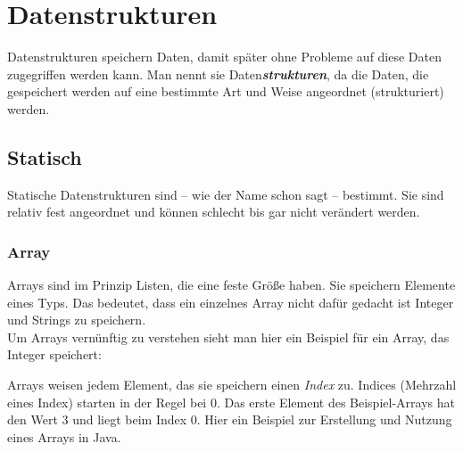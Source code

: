 \chapter{Datenstrukturen}
\begin{flushleft}   
    Datenstrukturen speichern Daten, damit später ohne Probleme auf diese Daten zugegriffen werden kann.
    Man nennt sie Daten\textbf{\textit{strukturen}}, da die Daten, die gespeichert werden auf eine bestimmte Art und Weise angeordnet (strukturiert) werden.
\end{flushleft}

\section{Statisch}
\begin{flushleft}
    Statische Datenstrukturen sind -- wie der Name schon sagt -- bestimmt.
    Sie sind relativ fest angeordnet und können schlecht bis gar nicht verändert werden.
\end{flushleft}

\subsection{Array}
\begin{flushleft}
    Arrays sind im Prinzip Listen, die eine feste Größe haben.
    Sie speichern Elemente eines Typs.
    Das bedeutet, dass ein einzelnes Array nicht dafür gedacht ist Integer und Strings zu speichern. \\
    Um Arrays vernünftig zu verstehen sieht man hier ein Beispiel für ein Array, das Integer speichert:
\end{flushleft}

\begin{center}
\end{center}

\begin{flushleft}
    Arrays weisen jedem Element, das sie speichern einen \textit{Index} zu.
    Indices (Mehrzahl eines Index) starten in der Regel bei $0$.
    Das erste Element des Beispiel-Arrays hat den Wert $3$ und liegt beim Index $0$.
    Hier ein Beispiel zur Erstellung und Nutzung eines Arrays in Java.
\end{flushleft}

